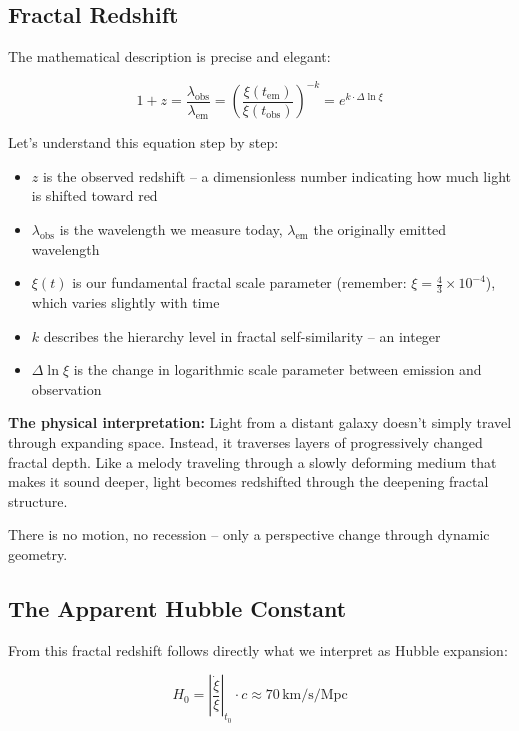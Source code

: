 \documentclass[12pt,a4paper]{article}
\begin{document}
\subsection{Fractal Redshift}

The mathematical description is precise and elegant:

\begin{equation}
1 + z = \frac{\lambda_{\text{obs}}}{\lambda_{\text{em}}} = \left(\frac{\xi(t_{\text{em}})}{\xi(t_{\text{obs}})}\right)^{-k} = e^{k \cdot \Delta \ln \xi}
\end{equation}

Let's understand this equation step by step:

\begin{itemize}[leftmargin=*]
\item $z$ is the observed redshift -- a dimensionless number indicating how much light is shifted toward red
\item $\lambda_{\text{obs}}$ is the wavelength we measure today, $\lambda_{\text{em}}$ the originally emitted wavelength
\item $\xi(t)$ is our fundamental fractal scale parameter (remember: $\xi = \frac{4}{3} \times 10^{-4}$), which varies slightly with time
\item $k$ describes the hierarchy level in fractal self-similarity -- an integer
\item $\Delta \ln \xi$ is the change in logarithmic scale parameter between emission and observation
\end{itemize}

\textbf{The physical interpretation:} Light from a distant galaxy doesn't simply travel through expanding space. Instead, it traverses layers of progressively changed fractal depth. Like a melody traveling through a slowly deforming medium that makes it sound deeper, light becomes redshifted through the deepening fractal structure.

There is no motion, no recession -- only a perspective change through dynamic geometry.

\subsection{The Apparent Hubble Constant}

From this fractal redshift follows directly what we interpret as Hubble expansion:

\begin{equation}
H_0 = \left|\frac{\dot{\xi}}{\xi}\right|_{t_0} \cdot c \approx 70 \, \text{km/s/Mpc}
\end{equation}
\end{document}
